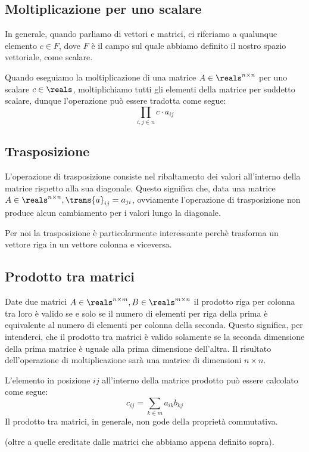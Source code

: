 \subsection{Moltiplicazione per uno scalare}
In generale, quando parliamo di vettori e matrici, ci riferiamo a qualunque elemento $c \in F$, dove $F$ è il campo sul quale abbiamo definito il nostro spazio vettoriale, come scalare.

Quando eseguiamo la moltiplicazione di una matrice $A \in \reals^{n \times n}$ per uno scalare $c \in \reals$, moltiplichiamo tutti gli elementi della matrice per suddetto scalare, dunque l'operazione può essere tradotta come segue:
\begin{equation*}
    \prod_{i, j \in n} c \cdot a_{ij}
\end{equation*}
\subsection{Trasposizione}
L'operazione di trasposizione consiste nel ribaltamento dei valori all'interno della matrice rispetto alla sua diagonale. Questo significa che, data una matrice $A \in \reals^{n \times n}, \trans{a}_{ij} = a_{ji}$, ovviamente l'operazione di trasposizione non produce alcun cambiamento per i valori lungo la diagonale.

Per noi la trasposizione è particolarmente interessante perchè trasforma un vettore riga in un vettore colonna e viceversa.
\subsection{Prodotto tra matrici}
Date due matrici $A \in \reals^{n \times m}, B \in \reals^{m \times n}$ il prodotto riga per colonna tra loro è valido se e solo se il numero di elementi per riga della prima è equivalente al numero di elementi per colonna della seconda. Questo significa, per intenderci, che il prodotto tra matrici è valido solamente se la seconda dimensione della prima matrice è uguale alla prima dimensione dell'altra.
Il risultato dell'operazione di moltiplicazione sarà una matrice di dimensioni $n \times n$.

L'elemento in posizione $ij$ all'interno della matrice prodotto può essere calcolato come segue:
\begin{equation*}
    c_{ij} = \sum_{k \in m}a_{ik}b_{kj}
\end{equation*}
Il prodotto tra matrici, in generale, non gode della proprietà commutativa.

 (oltre a quelle ereditate dalle matrici che abbiamo appena definito sopra).
